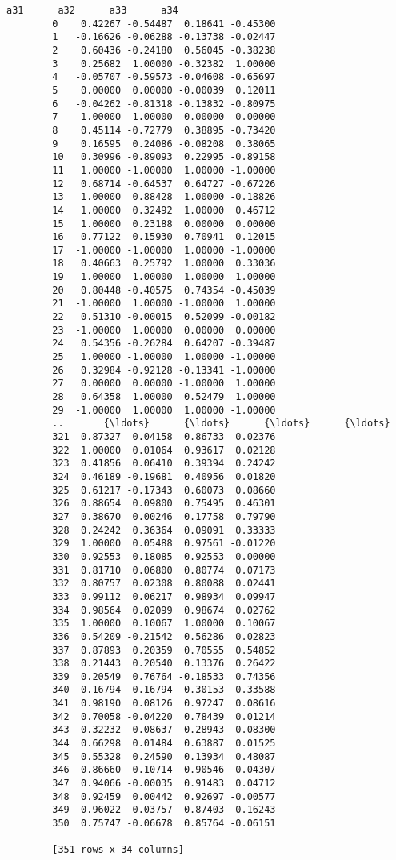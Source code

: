 \documentclass[11pt]{article}
\begin{document}
\begin{Verbatim}[commandchars=\\\{\}]
                 a31      a32      a33      a34  
        0    0.42267 -0.54487  0.18641 -0.45300  
        1   -0.16626 -0.06288 -0.13738 -0.02447  
        2    0.60436 -0.24180  0.56045 -0.38238  
        3    0.25682  1.00000 -0.32382  1.00000  
        4   -0.05707 -0.59573 -0.04608 -0.65697  
        5    0.00000  0.00000 -0.00039  0.12011  
        6   -0.04262 -0.81318 -0.13832 -0.80975  
        7    1.00000  1.00000  0.00000  0.00000  
        8    0.45114 -0.72779  0.38895 -0.73420  
        9    0.16595  0.24086 -0.08208  0.38065  
        10   0.30996 -0.89093  0.22995 -0.89158  
        11   1.00000 -1.00000  1.00000 -1.00000  
        12   0.68714 -0.64537  0.64727 -0.67226  
        13   1.00000  0.88428  1.00000 -0.18826  
        14   1.00000  0.32492  1.00000  0.46712  
        15   1.00000  0.23188  0.00000  0.00000  
        16   0.77122  0.15930  0.70941  0.12015  
        17  -1.00000 -1.00000  1.00000 -1.00000  
        18   0.40663  0.25792  1.00000  0.33036  
        19   1.00000  1.00000  1.00000  1.00000  
        20   0.80448 -0.40575  0.74354 -0.45039  
        21  -1.00000  1.00000 -1.00000  1.00000  
        22   0.51310 -0.00015  0.52099 -0.00182  
        23  -1.00000  1.00000  0.00000  0.00000  
        24   0.54356 -0.26284  0.64207 -0.39487  
        25   1.00000 -1.00000  1.00000 -1.00000  
        26   0.32984 -0.92128 -0.13341 -1.00000  
        27   0.00000  0.00000 -1.00000  1.00000  
        28   0.64358  1.00000  0.52479  1.00000  
        29  -1.00000  1.00000  1.00000 -1.00000  
        ..       {\ldots}      {\ldots}      {\ldots}      {\ldots}  
        321  0.87327  0.04158  0.86733  0.02376  
        322  1.00000  0.01064  0.93617  0.02128  
        323  0.41856  0.06410  0.39394  0.24242  
        324  0.46189 -0.19681  0.40956  0.01820  
        325  0.61217 -0.17343  0.60073  0.08660  
        326  0.88654  0.09800  0.75495  0.46301  
        327  0.38670  0.00246  0.17758  0.79790  
        328  0.24242  0.36364  0.09091  0.33333  
        329  1.00000  0.05488  0.97561 -0.01220  
        330  0.92553  0.18085  0.92553  0.00000  
        331  0.81710  0.06800  0.80774  0.07173  
        332  0.80757  0.02308  0.80088  0.02441  
        333  0.99112  0.06217  0.98934  0.09947  
        334  0.98564  0.02099  0.98674  0.02762  
        335  1.00000  0.10067  1.00000  0.10067  
        336  0.54209 -0.21542  0.56286  0.02823  
        337  0.87893  0.20359  0.70555  0.54852  
        338  0.21443  0.20540  0.13376  0.26422  
        339  0.20549  0.76764 -0.18533  0.74356  
        340 -0.16794  0.16794 -0.30153 -0.33588  
        341  0.98190  0.08126  0.97247  0.08616  
        342  0.70058 -0.04220  0.78439  0.01214  
        343  0.32232 -0.08637  0.28943 -0.08300  
        344  0.66298  0.01484  0.63887  0.01525  
        345  0.55328  0.24590  0.13934  0.48087  
        346  0.86660 -0.10714  0.90546 -0.04307  
        347  0.94066 -0.00035  0.91483  0.04712  
        348  0.92459  0.00442  0.92697 -0.00577  
        349  0.96022 -0.03757  0.87403 -0.16243  
        350  0.75747 -0.06678  0.85764 -0.06151  
        
        [351 rows x 34 columns]
\end{Verbatim}
            
\end{document}

